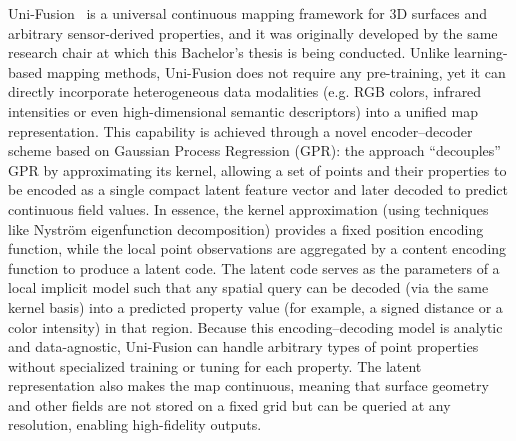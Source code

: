 \documentclass[english, bachelor, utf8]{base/thesis_telematics}
\begin{document}
Uni-Fusion~\cite{yuan2024uni} is a universal continuous mapping framework for 3D surfaces and arbitrary sensor-derived properties, and it was
originally developed by the same research chair at which this Bachelor's thesis is being conducted. Unlike
learning-based mapping methods, Uni-Fusion does not require any pre-training, yet it can directly incorporate heterogeneous
data modalities (e.g. RGB colors, infrared intensities or even high-dimensional semantic descriptors) into a unified map
representation. This capability is achieved through a novel encoder--decoder scheme based on Gaussian
Process Regression (GPR): the approach “decouples” GPR by approximating its kernel, allowing a set of points and their
properties to be encoded as a single compact latent feature vector and later decoded to predict continuous field values. In essence, the kernel approximation (using techniques like Nyström eigenfunction decomposition)
provides a fixed position encoding function, while the local point observations are aggregated by a content encoding function
to produce a latent code. The latent code serves as the parameters of a local implicit model such that any spatial query can
be decoded (via the same kernel basis) into a predicted property value (for example, a signed distance or a color intensity) in
that region. Because this encoding--decoding model is analytic and data-agnostic, Uni-Fusion can handle
arbitrary types of point properties without specialized training or tuning for each property. The latent
representation also makes the map continuous, meaning that surface geometry and other fields are not stored on a fixed grid
but can be queried at any resolution, enabling high-fidelity outputs.
\end{document}
